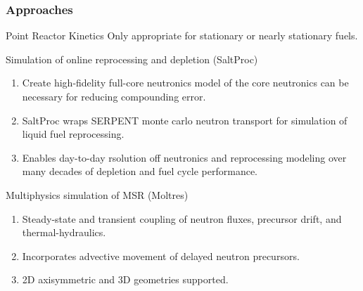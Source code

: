 \begin{frame}
  \frametitle{Approaches}
                  \vspace*{-0.1in}
              \begin{block}{Point Reactor Kinetics \cite{huff_pyrk:_2015}}
                Only appropriate for stationary or nearly stationary fuels.
              \end{block}

              \begin{block}{Simulation of online reprocessing and depletion (SaltProc)\cite{rykhlevskii_saltproc}}
               \begin{enumerate}
                \item Create high-fidelity full-core neutronics model of the 
                        core neutronics can be necessary for reducing 
                               compounding error.
                \item SaltProc wraps SERPENT monte carlo neutron transport for 
                        simulation of liquid fuel reprocessing.
                \item Enables day-to-day rsolution off neutronics and reprocessing modeling 
                        over many decades of depletion and fuel cycle performance.
               \end{enumerate}
               \end{block}

              \begin{block}{Multiphysics simulation of \gls{MSR} (Moltres)\cite{lindsay_introduction_2018}}
               \begin{enumerate}
                \item Steady-state and transient coupling of neutron fluxes, 
                        precursor drift, and thermal-hydraulics.
                \item Incorporates advective movement of delayed neutron precursors.
                \item 2D axisymmetric and 3D geometries supported.
               \end{enumerate}
               \end{block}

\end{frame}
